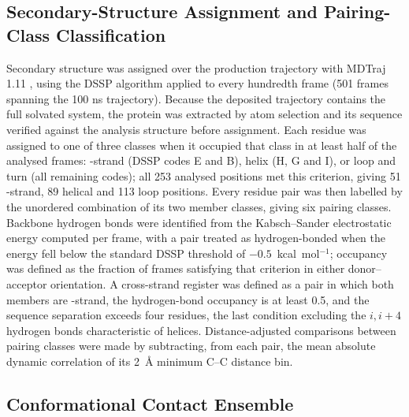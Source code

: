 \documentclass[utf8]{FrontiersinHarvard}
\begin{document}
\subsection{Secondary-Structure Assignment and Pairing-Class Classification}
\label{sec:ssmethods}

Secondary structure was assigned over the production trajectory with MDTraj 1.11 \citep{McGibbon2015}, using the DSSP algorithm \citep{KabschSander1983} applied to every hundredth frame (501 frames spanning the 100 ns trajectory). Because the deposited trajectory contains the full solvated system, the protein was extracted by atom selection and its sequence verified against the analysis structure before assignment. Each residue was assigned to one of three classes when it occupied that class in at least half of the analysed frames: \textbeta{}-strand (DSSP codes E and B), helix (H, G and I), or loop and turn (all remaining codes); all 253 analysed positions met this criterion, giving 51 \textbeta{}-strand, 89 helical and 113 loop positions. Every residue pair was then labelled by the unordered combination of its two member classes, giving six pairing classes. Backbone hydrogen bonds were identified from the Kabsch--Sander electrostatic energy computed per frame, with a pair treated as hydrogen-bonded when the energy fell below the standard DSSP threshold of $-0.5$~kcal~mol$^{-1}$; occupancy was defined as the fraction of frames satisfying that criterion in either donor--acceptor orientation. A cross-strand \textbeta{} register was defined as a pair in which both members are \textbeta{}-strand, the hydrogen-bond occupancy is at least 0.5, and the sequence separation exceeds four residues, the last condition excluding the $i,i+4$ hydrogen bonds characteristic of helices. Distance-adjusted comparisons between pairing classes were made by subtracting, from each pair, the mean absolute dynamic correlation of its 2~\AA{} minimum C\textalpha{}--C\textalpha{} distance bin.

\subsection{Conformational Contact Ensemble}
\label{sec:ensemble}
\end{document}
